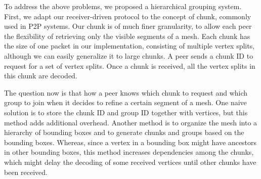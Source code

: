 \documentclass{sig-alt-release2}
\begin{document}
    
    To address the above problems, we proposed a hierarchical grouping system.
    First, we adapt our receiver-driven protocol to the concept of chunk,
    commonly used in P2P systems.
    Our chunk is of much finer granularity, to allow each peer
    the flexibility of retrieving only the visible segments of a mesh.
    Each chunk has the size of one packet in our implementation, consisting of 
    multiple vertex splits, although we can easily generalize it to
    large chunks. A peer sends a chunk ID to request for a set of vertex splits.
    Once a chunk is received, 
    all the vertex splits in this chunk are decoded.
    
    The question now is that how a peer knows which chunk to request
    and which group to join when it decides to refine a certain segment of a mesh.  
    One naive solution is to store the chunk ID and group ID together with vertices,
    but this method adds additional overhead.
    Another method is to organize the mesh into a
    hierarchy of bounding boxes and to generate chunks and groups based on the bounding boxes.
    Whereas, since a vertex in a bounding box might have ancestors in other bounding
    boxes, this method increases dependencies among the chunks, which might
    delay the decoding of some received vertices until other chunks have been received.
      
\end{document}
